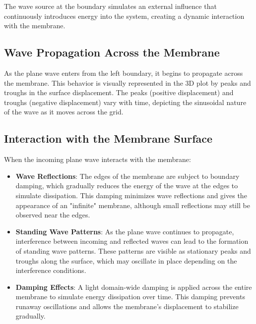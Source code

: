 \documentclass{article}
\begin{document}
The wave source at the boundary simulates an external influence that continuously introduces energy into the system, creating a dynamic interaction with the membrane.

\subsection{Wave Propagation Across the Membrane}
As the plane wave enters from the left boundary, it begins to propagate across the membrane. This behavior is visually represented in the 3D plot by peaks and troughs in the surface displacement. The peaks (positive displacement) and troughs (negative displacement) vary with time, depicting the sinusoidal nature of the wave as it moves across the grid.

\subsection{Interaction with the Membrane Surface}
When the incoming plane wave interacts with the membrane:
\begin{itemize}
    \item \textbf{Wave Reflections}: The edges of the membrane are subject to boundary damping, which gradually reduces the energy of the wave at the edges to simulate dissipation. This damping minimizes wave reflections and gives the appearance of an "infinite" membrane, although small reflections may still be observed near the edges.
    \item \textbf{Standing Wave Patterns}: As the plane wave continues to propagate, interference between incoming and reflected waves can lead to the formation of standing wave patterns. These patterns are visible as stationary peaks and troughs along the surface, which may oscillate in place depending on the interference conditions.
    \item \textbf{Damping Effects}: A light domain-wide damping is applied across the entire membrane to simulate energy dissipation over time. This damping prevents runaway oscillations and allows the membrane's displacement to stabilize gradually.
\end{itemize}
\end{document}

